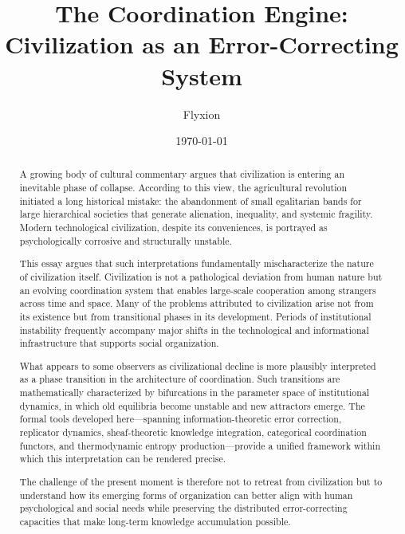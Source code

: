 \documentclass[12pt]{article}
\title{
The Coordination Engine:\\
\large Civilization as an Error-Correcting System
}
\author{Flyxion}
\date{\today}
\begin{document}
\maketitle

\begin{abstract}

A growing body of cultural commentary argues that civilization is entering an inevitable phase of collapse. According to this view, the agricultural revolution initiated a long historical mistake: the abandonment of small egalitarian bands for large hierarchical societies that generate alienation, inequality, and systemic fragility. Modern technological civilization, despite its conveniences, is portrayed as psychologically corrosive and structurally unstable.

This essay argues that such interpretations fundamentally mischaracterize the nature of civilization itself. Civilization is not a pathological deviation from human nature but an evolving coordination system that enables large-scale cooperation among strangers across time and space. Many of the problems attributed to civilization arise not from its existence but from transitional phases in its development. Periods of institutional instability frequently accompany major shifts in the technological and informational infrastructure that supports social organization.

What appears to some observers as civilizational decline is more plausibly interpreted as a phase transition in the architecture of coordination. Such transitions are mathematically characterized by bifurcations in the parameter space of institutional dynamics, in which old equilibria become unstable and new attractors emerge. The formal tools developed here---spanning information-theoretic error correction, replicator dynamics, sheaf-theoretic knowledge integration, categorical coordination functors, and thermodynamic entropy production---provide a unified framework within which this interpretation can be rendered precise.

The challenge of the present moment is therefore not to retreat from civilization but to understand how its emerging forms of organization can better align with human psychological and social needs while preserving the distributed error-correcting capacities that make long-term knowledge accumulation possible.

\end{abstract}

\newpage
\tableofcontents
\end{document}

